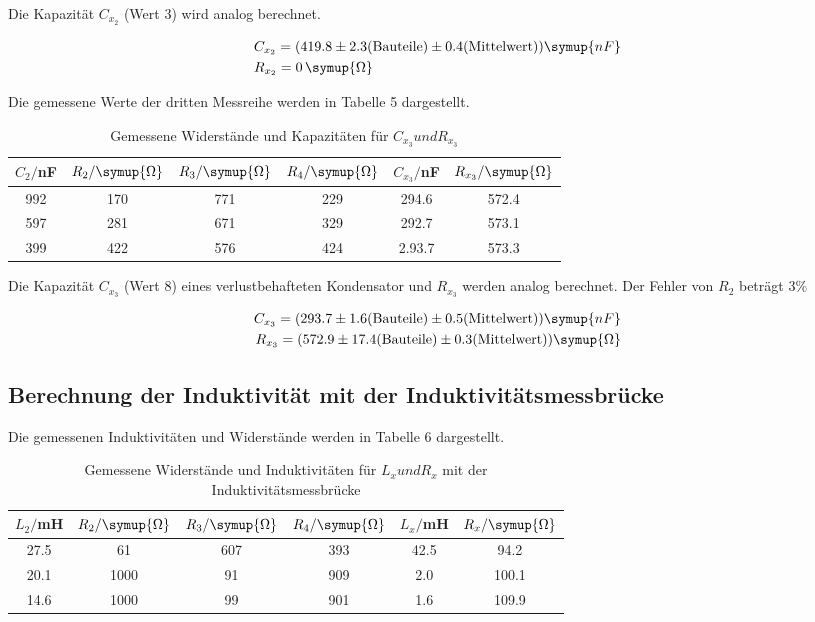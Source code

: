 Die Kapazität $C_{x_2}$ (Wert 3) wird analog berechnet.

\begin{align*}
  &C_{x_2} = (419.8 \pm 2.3 \text{(Bauteile)} \pm 0.4 \text{(Mittelwert)})  \symup{nF} \\
  &R_{x_2} = 0 \, \symup{\Omega}
\end{align*}


Die gemessene Werte der dritten Messreihe werden in Tabelle 5 dargestellt.

\begin{table}[H]
  \centering
  \caption{Gemessene Widerstände und Kapazitäten für $C_{x_3} und R_{x_3}$}
  \label{tab:Widerstand}
  \begin{tabular}{c c c c c c}
    \toprule
    $C_2/$nF & $R_2/ \symup{\Omega}$ & $R_3/ \symup{\Omega}$ & $R_4 / \symup{\Omega}$ & $C_{x_3}/$nF & $R_{x_3}/ \symup{\Omega}$  \\
    \midrule
    992 & 170 & 771 & 229 &  294.6 & 572.4  \\
    597 & 281 & 671 & 329 &  292.7 & 573.1  \\
    399 & 422 & 576 & 424 &  2.93.7 & 573.3  \\
    \bottomrule
  \end{tabular}
\end{table}

Die Kapazität $C_{x_3}$ (Wert 8) eines verlustbehafteten Kondensator und $R_{x_3}$ werden analog berechnet.
Der Fehler von $R_2$ beträgt $3\%$

\begin{align*}
  C_{x_3} = (293.7 \pm 1.6 \text{(Bauteile)} \pm 0.5 \text{(Mittelwert)})  \symup{nF} \\
  R_{x_3} = (572.9 \pm 17.4 \text{(Bauteile)} \pm 0.3\text{(Mittelwert)}) \symup{\Omega}
\end{align*}



\subsection{Berechnung der Induktivität mit der Induktivitätsmessbrücke}

Die gemessenen Induktivitäten und Widerstände werden in Tabelle 6 dargestellt.

\begin{table}[H]
  \centering
  \caption{Gemessene Widerstände und Induktivitäten für $L_{x} und R_{x}$ mit der Induktivitätsmessbrücke}
  \label{tab:Widerstand}
  \begin{tabular}{c c c c c c}
    \toprule
    $L_2/$mH & $R_2/ \symup{\Omega}$ & $R_3/ \symup{\Omega}$ & $R_4 / \symup{\Omega}$ & $L_x/$mH & $R_x / \symup{\Omega}$  \\
    \midrule
    27.5 &   61 & 607 & 393 & 42.5   & 94.2 \\
    20.1 & 1000 &  91 & 909 &  2.0   & 100.1\\
    14.6 & 1000 &  99 & 901 &  1.6   & 109.9\\
    \bottomrule
  \end{tabular}
\end{table}


